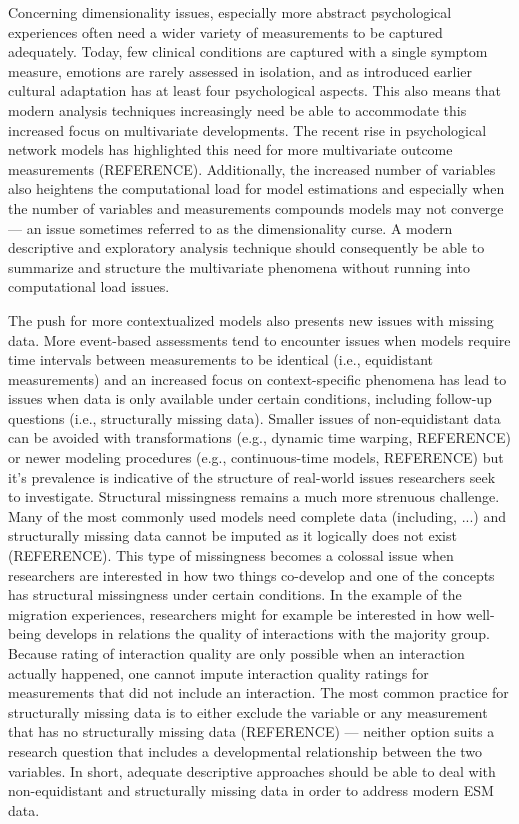 \documentclass[man, 12pt, a4paper]{apa7}
\theoremstyle{break}
\theoremstyle{plain}
\begin{document}
Concerning dimensionality issues, especially more abstract psychological experiences often need a wider variety of measurements to be captured adequately. Today, few clinical conditions are captured with a single symptom measure, emotions are rarely assessed in isolation, and as introduced earlier cultural adaptation has at least four psychological aspects. This also means that modern analysis techniques increasingly need be able to accommodate this increased focus on multivariate developments. The recent rise in psychological network models has highlighted this need for more multivariate outcome measurements (REFERENCE). Additionally, the increased number of variables also heightens the computational load for model estimations and especially when the number of variables and measurements compounds models may not converge --- an issue sometimes referred to as the dimensionality curse. A modern descriptive and exploratory analysis technique should consequently be able to summarize and structure the multivariate phenomena without running into computational load issues.

The push for more contextualized models also presents new issues with missing data. More event-based assessments tend to encounter issues when models require time intervals between measurements to be identical (i.e., equidistant measurements) and an increased focus on context-specific phenomena has lead to issues when data is only available under certain conditions, including follow-up questions (i.e., structurally missing data). Smaller issues of non-equidistant data can be avoided with transformations (e.g., dynamic time warping, REFERENCE) or newer modeling procedures (e.g., continuous-time models, REFERENCE) but it's prevalence is indicative of the structure of real-world issues researchers seek to investigate. Structural missingness remains a much more strenuous challenge. Many of the most commonly used models need complete data (including, ...) and structurally missing data cannot be imputed as it logically does not exist (REFERENCE). This type of missingness becomes a colossal issue when researchers are interested in how two things co-develop and one of the concepts has structural missingness under certain conditions. In the example of the migration experiences, researchers might for example be interested in how well-being develops in relations the quality of interactions with the majority group. Because rating of interaction quality are only possible when an interaction actually happened, one cannot impute interaction quality ratings for measurements that did not include an interaction. The most common practice for structurally missing data is to either exclude the variable or any measurement that has no structurally missing data (REFERENCE) --- neither option suits a research question that includes a developmental relationship between the two variables. In short, adequate descriptive approaches should be able to deal with non-equidistant and structurally missing data in order to address modern ESM data.
\end{document}
